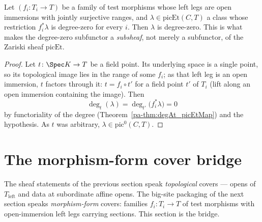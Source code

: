 \begin{theorem}
  \label{pa-thm:mem_pic0Subgroup_of_cover}
  \leanok

  Let \((f_i \colon T_i \to T)\) be a family of test morphisms whose left legs are open
  immersions with jointly surjective ranges, and \(\lambda \in \mathrm{picEt}(C,T)\) a class
  whose restriction \(f_i^{*}\lambda\) is degree-zero for every \(i\). Then \(\lambda\) is
  degree-zero. This is what makes the degree-zero subfunctor a \emph{subsheaf}, not merely a
  subfunctor, of the Zariski sheaf \(\mathrm{picEt}\).
\end{theorem}
\begin{proof}
  \leanok
  Let \(t \colon \Spec K \to T\) be a field point. Its underlying space is a single point,
  so its topological image lies in the range of some \(f_i\); as that left leg is an open
  immersion, \(t\) factors through it: \(t = f_i \circ t'\) for a field point \(t'\) of
  \(T_i\) (lift along an open immersion containing the image). Then
  \[
    \deg_t(\lambda) = \deg_{t'}\bigl(f_i^{*}\lambda\bigr) = 0
  \]
  by functoriality of the degree (Theorem~\ref{pa-thm:degAt_picEtMap}) and the hypothesis. As
  \(t\) was arbitrary, \(\lambda \in \mathrm{pic}^0(C,T)\).
\end{proof}

\section{The morphism-form cover bridge}
\label{pa-sec:coverBridge}

The sheaf statements of the previous section speak \emph{topological} covers — opens of
\(T_{\mathrm{left}}\) and data at subordinate affine opens. The big-site packaging of the
next section speaks \emph{morphism-form} covers: families \(f_i \colon T_i \to T\) of test
morphisms with open-immersion left legs carrying sections. This section is the bridge.


